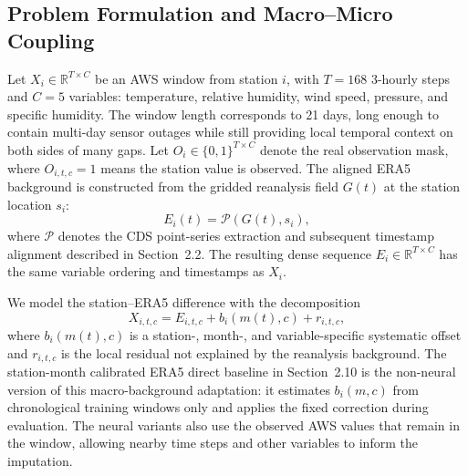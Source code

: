 \subsection{Problem Formulation and Macro--Micro Coupling}
Let $X_i \in \mathbb{R}^{T \times C}$ be an AWS window from station $i$, with $T=168$ 3-hourly steps and $C=5$ variables: temperature, relative humidity, wind speed, pressure, and specific humidity. The window length corresponds to 21 days, long enough to contain multi-day sensor outages while still providing local temporal context on both sides of many gaps. Let $O_i \in \{0,1\}^{T \times C}$ denote the real observation mask, where $O_{i,t,c}=1$ means the station value is observed. The aligned ERA5 background is constructed from the gridded reanalysis field $G(t)$ at the station location $s_i$:
\begin{equation}
E_i(t)=\mathcal{P}(G(t),s_i),
\label{eq:era5-extraction}
\end{equation}
where $\mathcal{P}$ denotes the CDS point-series extraction and subsequent timestamp alignment described in Section~2.2. The resulting dense sequence $E_i \in \mathbb{R}^{T \times C}$ has the same variable ordering and timestamps as $X_i$.

We model the station--ERA5 difference with the decomposition
\begin{equation}
X_{i,t,c}=E_{i,t,c}+b_i(m(t),c)+r_{i,t,c},
\label{eq:bias-decomposition}
\end{equation}
where $b_i(m(t),c)$ is a station-, month-, and variable-specific systematic offset and $r_{i,t,c}$ is the local residual not explained by the reanalysis background. The station-month calibrated ERA5 direct baseline in Section~2.10 is the non-neural version of this macro-background adaptation: it estimates $b_i(m,c)$ from chronological training windows only and applies the fixed correction during evaluation. The neural variants also use the observed AWS values that remain in the window, allowing nearby time steps and other variables to inform the imputation.

